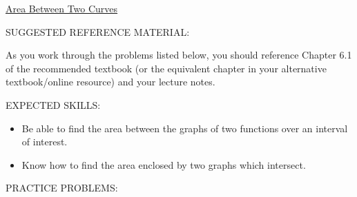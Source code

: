 \documentclass[12pt]{article}
\begin{document}
\begin{center}
\underline{\LARGE{Area Between Two Curves}}
\end{center}

\noindent SUGGESTED REFERENCE MATERIAL:

\bigskip

\noindent As you work through the problems listed below, you should reference Chapter 6.1 of the recommended textbook (or the equivalent chapter in your alternative textbook/online resource) and your lecture notes.

\bigskip

\noindent EXPECTED SKILLS:

\begin{itemize}

\item Be able to find the area between the graphs of two functions over an interval of interest.

\item Know how to find the area enclosed by two graphs which intersect.

\end{itemize}

\noindent PRACTICE PROBLEMS:

\medskip
\end{document}
